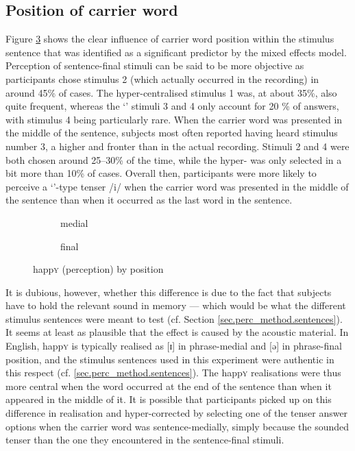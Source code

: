 \subsection{Position of carrier word}
\label{sec.perc_res.happy.position}

Figure \ref{fig.bar.happy.tot.ext.pos} shows the clear influence of carrier word position within the stimulus sentence that was identified as a significant predictor by the mixed effects model.
Perception of sentence-final stimuli can be said to be more objective as participants chose stimulus 2 (which actually occurred in the recording) in around 45\% of cases.
The hyper-centralised stimulus 1 was, at about 35\%, also quite frequent, whereas the `' stimuli 3 and 4 only account for 20 \% of answers, with stimulus 4 being particularly rare.
When the carrier word was presented in the middle of the sentence, subjects most often reported having heard stimulus number 3, a  higher and fronter than in the actual recording.
Stimuli 2 and 4 were both chosen around 25--30\% of the time, while the hyper-  was only selected in a bit more than 10\% of cases.
Overall then, participants were more likely to perceive a `'-type tenser /i/ when the carrier word was presented in the middle of the sentence than when it occurred as the last word in the sentence.

\begin{figure}[h]
	\centering
	\begin{subfigure}{0.49\textwidth}
		\centering
			\resizebox{\linewidth}{!}{} 
		\caption{medial}
		\label{fig.bar.happy.tot.ext.med}
	\end{subfigure}
	\begin{subfigure}{0.49\textwidth}
		\centering
			\resizebox{\linewidth}{!}{} 
		\caption{final}
		\label{fig.bar.happy.tot.ext.fin}
	\end{subfigure}
	\caption{happ\textsc{y} (perception) by position}
	\label{fig.bar.happy.tot.ext.pos}
\end{figure}

It is dubious, however, whether this difference is due to the fact that subjects have to hold the relevant sound in memory --- which would be what the different stimulus sentences were meant to test (cf. Section \ref{sec.perc_method.sentences}).
It seems at least as plausible that the effect is caused by the acoustic material.
In  English, happ\textsc{y} is typically realised as [ɪ] in phrase-medial and [ə] in phrase-final position, and the stimulus sentences used in this experiment were authentic in this respect (cf. \ref{sec.perc_method.sentences}).
The happ\textsc{y} realisations were thus more central when the word occurred at the end of the sentence than when it appeared in the middle of it.
It is possible that participants picked up on this difference in realisation and hyper-corrected by selecting one of the tenser answer options when the carrier word was sentence-medially, simply because the  sounded tenser than the one they encountered in the sentence-final stimuli.

